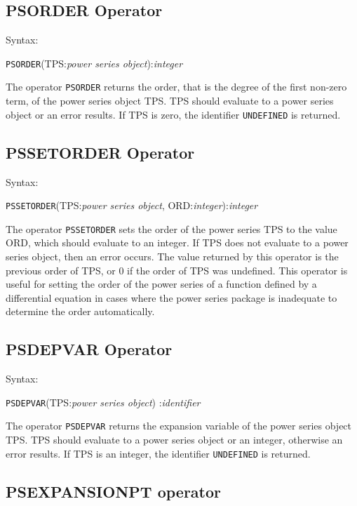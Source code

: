 \subsection{PSORDER Operator}

Syntax:

\hspace*{2em} {\tt PSORDER}(TPS:{\em power series object}):{\em integer}

The operator {\tt PSORDER} returns the order, that is the degree of
the first non-zero term, of the power series object TPS.
TPS should evaluate to a power series object or an error results. If
TPS is zero, the identifier {\tt UNDEFINED} is returned.

\subsection{PSSETORDER Operator}

Syntax:

\hspace*{2em} {\tt PSSETORDER}(TPS:{\em power series object},
ORD:{\em integer}):{\em integer}

The operator {\tt PSSETORDER} sets the order of the power series
TPS to the value ORD, which should evaluate to an integer. If
TPS does not evaluate to a power series object, then an error
occurs. The value returned by this operator is the previous order of
TPS, or 0 if the order of TPS was undefined.  This
operator is useful for setting the order of the power series of a
function defined by a differential equation in cases where the power
series package is inadequate to determine the order automatically.


\subsection{PSDEPVAR Operator}

Syntax:

\hspace*{2em} {\tt PSDEPVAR}(TPS:{\em power series object})
:{\em identifier}

The operator {\tt PSDEPVAR} returns the expansion variable of the
power series object TPS. TPS should evaluate to a power
series object or an integer, otherwise an error results. If TPS
is an integer, the identifier {\tt UNDEFINED} is returned.

\subsection{PSEXPANSIONPT operator}


